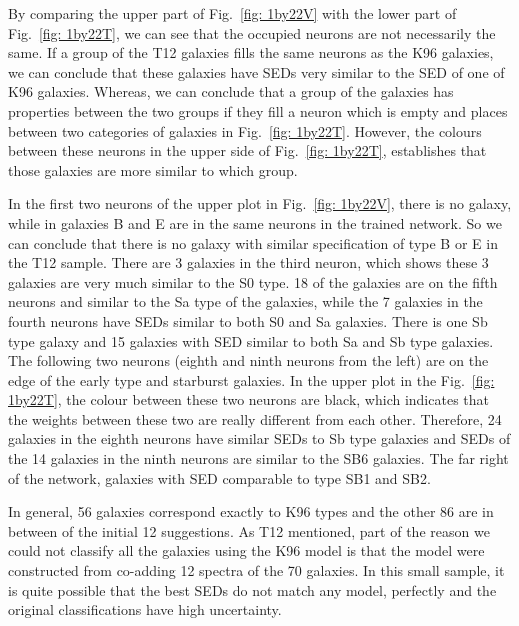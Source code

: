             By comparing the upper part of Fig.~\ref{fig: 1by22V} with the lower part of Fig.~\ref{fig: 1by22T}, we can see that the occupied neurons are not necessarily the same.
            If a group of the T12 galaxies fills the same neurons as the K96 galaxies, we can conclude that these galaxies have SEDs very similar to the SED of one of K96 galaxies.
            Whereas, we can conclude that a group of the galaxies has properties between the two groups if they fill a neuron which is empty and places between two categories of galaxies in Fig.~\ref{fig: 1by22T}.
            However, the colours between these neurons in the upper side of Fig.~\ref{fig: 1by22T}, establishes that those galaxies are more similar to which group. 
            
            In the first two neurons of the upper plot in Fig.~\ref{fig: 1by22V}, there is no galaxy, while in galaxies B and E are in the same neurons in the trained network.
            So we can conclude that there is no galaxy with similar specification of type B or E in the T12 sample.
            There are 3 galaxies in the third neuron, which shows these 3 galaxies are very much similar to the S0 type. 
            18 of the galaxies are on the fifth neurons and similar to the Sa type of the galaxies, while the 7 galaxies in the fourth neurons have SEDs similar to both S0 and Sa galaxies.
            There is one Sb type galaxy and 15 galaxies with SED similar to both Sa and Sb type galaxies.
            The following two neurons (eighth and ninth neurons from the left) are on the edge of the early type and starburst galaxies.
            In the upper plot in the  Fig.~\ref{fig: 1by22T}, the colour between these two neurons are black, which indicates that the weights between these two are really different from each other.
            Therefore, 24 galaxies in the eighth neurons have similar SEDs to Sb type galaxies and SEDs of the 14 galaxies in the ninth neurons are similar to the SB6 galaxies.
            The far right of the network, galaxies with SED comparable to type SB1 and SB2.
            
            In general, 56 galaxies correspond exactly to K96 types and the other 86 are in between of the initial 12 suggestions.
            As T12 mentioned, part of the reason we could not classify all the galaxies using the K96 model is that the model were constructed from co-adding 12 spectra of the 70 galaxies.
            In this small sample, it is quite possible that the best SEDs do not match any model, perfectly and the original classifications have high uncertainty.
            
